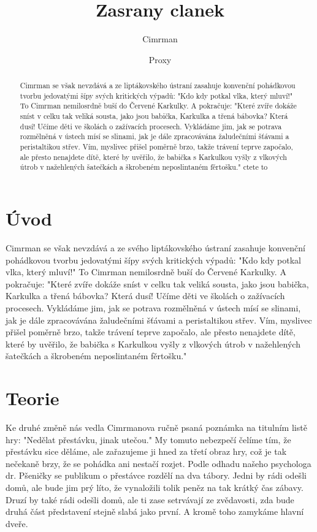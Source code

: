 \documentclass{cygclanek}
\title{Zasrany clanek}
\author[1]{Cimrman}
\author[2]{Proxy}
\affil[1]{Department of Mathematics, University X}
\affil[2]{Department of Biology, University Y}
\begin{document}
\maketitle
\begin{abstract}
	
	Cimrman se však nevzdává a ze  liptákovského ústraní zasahuje konvenční pohádkovou tvorbu jedovatými šípy svých kritických výpadů: "Kdo kdy potkal vlka, který mluví!" To Cimrman nemilosrdně buší do Červené Karkulky. A pokračuje: "Které zvíře dokáže sníst v celku tak veliká sousta, jako jsou babička, Karkulka a třená bábovka? Která dusí! Učíme děti ve školách o zažívacích procesech. Vykládáme jim, jak se potrava rozmělněná v ústech mísí se slinami, jak je dále zpracovávána žaludečními šťávami a peristaltikou střev. Vím, myslivec přišel poměrně brzo, takže trávení teprve započalo, ale přesto nenajdete dítě, které by uvěřilo, že babička s Karkulkou vyšly z vlkových útrob v nažehlených šatečkách a škrobeném neposlintaném fěrtošku."
	ctete to
\end{abstract}

\section{Úvod}
Cimrman se však nevzdává a ze svého liptákovského ústraní zasahuje konvenční pohádkovou tvorbu jedovatými šípy svých kritických výpadů: "Kdo kdy potkal vlka, který mluví!" To Cimrman nemilosrdně buší do Červené Karkulky. A pokračuje: "Které zvíře dokáže sníst v celku tak veliká sousta, jako jsou babička, Karkulka a třená bábovka? Která dusí! Učíme děti ve školách o zažívacích procesech. Vykládáme jim, jak se potrava rozmělněná v ústech mísí se slinami, jak je dále zpracovávána žaludečními šťávami a peristaltikou střev. Vím, myslivec přišel poměrně brzo, takže trávení teprve započalo, ale přesto nenajdete dítě, které by uvěřilo, že babička s Karkulkou vyšly z vlkových útrob v nažehlených šatečkách a škrobeném neposlintaném fěrtošku."
\section{Teorie}
Ke druhé změně nás vedla Cimrmanova ručně psaná poznámka na titulním listě hry: "Nedělat přestávku, jinak utečou." My tomuto nebezpečí čelíme tím, že přestávku sice děláme, ale zařazujeme ji hned za třetí obraz hry, což je tak nečekaně brzy, že se pohádka ani nestačí rozjet. Podle odhadu našeho psychologa dr. Pšeničky se publikum o přestávce rozdělí na dva tábory. Jedni by rádi odešli domů, ale bude jim prý líto, že vynaložili tolik peněz na tak krátký čas zábavy. Druzí by také rádi odešli domů, ale ti zase setrvávají ze zvědavosti, zda bude druhá část představení stejně slabá jako první. A kromě toho zamykáme hlavní dveře.
\end{document}
